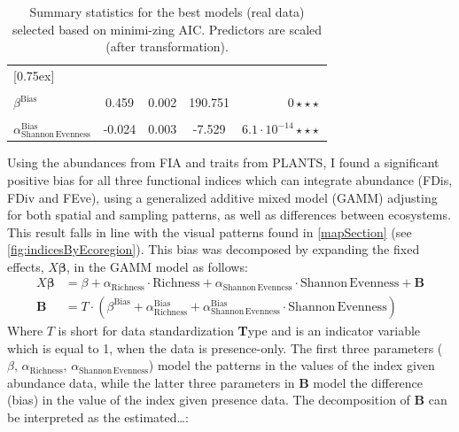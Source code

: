\documentclass[
  10pt,
]{article}
\begin{document}
\begin{table}[!h]
\begin{threeparttable}
\begin{tabular}[t]{lcccr}
[0.75ex]
\addlinespace[0.3em]
\multicolumn{1}{l}{\textbf{FEve}}\\
\rule{0pt}{2.75ex}\hspace{1em}\cellcolor{gray!6}{$\beta$} & \cellcolor{gray!6}{0.429} & \cellcolor{gray!6}{0.001} & \cellcolor{gray!6}{251.252} & \cellcolor{gray!6}{$0\star \star \star $}\\
[0.75ex]
\rule{0pt}{2.75ex}\hspace{1em}$\beta^\mathrm{Bias}$ & 0.459 & 0.002 & 190.751 & $0\star \star \star $\\
[0.75ex]
\rule{0pt}{2.75ex}\hspace{1em}\cellcolor{gray!6}{$\alpha_{\mathrm{Shannon\,Evenness}}$} & \cellcolor{gray!6}{0.021} & \cellcolor{gray!6}{0.002} & \cellcolor{gray!6}{9.133} & \cellcolor{gray!6}{$9.8 \cdot 10^{-20}\star \star \star $}\\
[0.75ex]
\rule{0pt}{2.75ex}\hspace{1em}$\alpha^{\mathrm{Bias}}_{\mathrm{Shannon\,Evenness}}$ & -0.024 & 0.003 & -7.529 & $6.1 \cdot 10^{-14}\star \star \star $\\
[0.75ex]
\bottomrule
\end{tabular}
\caption{\label{tab:realTab}Summary statistics for the best models (real data) selected based on minimi-zing AIC. Predictors are scaled (after transformation).}

\end{threeparttable}
\vspace{1cm}
\end{table}

Using the abundances from FIA and traits from PLANTS, I found a significant positive bias for all three functional indices which can integrate abundance (FDis, FDiv and FEve), using a generalized additive mixed model (GAMM) adjusting for both spatial and sampling patterns, as well as differences between ecosystems. This result falls in line with the visual patterns found in \autoref{mapSection} (see \autoref{fig:indicesByEcoregion}). This bias was decomposed by expanding the fixed effects, \(X\boldsymbol{\beta}\), in the GAMM model as follows:
\begin{align*}
  X\boldsymbol{\beta}&=\beta + \alpha_\mathrm{Richness}\cdot\mathrm{Richness} + \alpha_\mathrm{Shannon\,Evenness}\cdot\mathrm{Shannon\,Evenness} + \mathbf{B} \\
  \mathbf{B}&=T\cdot(\beta^\mathrm{Bias} + \alpha^\mathrm{Bias}_\mathrm{Richness} + \alpha^\mathrm{Bias}_\mathrm{Shannon\,Evenness}\cdot\mathrm{Shannon\,Evenness})
\end{align*}
Where \(T\) is short for data standardization \textbf{T}ype and is an indicator variable which is equal to 1, when the data is presence-only. The first three parameters (\(\beta,\,\alpha_\mathrm{Richness},\,\alpha_\mathrm{Shannon\,Evenness}\)) model the patterns in the values of the index given abundance data, while the latter three parameters in \(\mathbf{B}\) model the difference (bias) in the value of the index given presence data. The decomposition of \(\mathbf{B}\) can be interpreted as the estimated\ldots:
\end{document}
